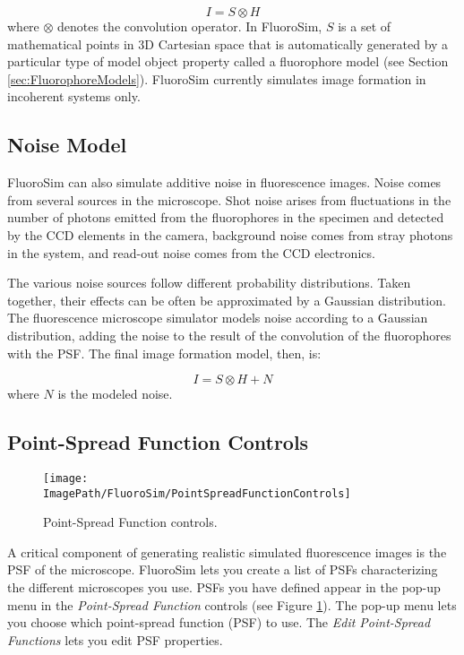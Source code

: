 \documentclass[11pt,titlepage,twoside]{article}
\begin{document}
\begin{equation}
I = S \otimes H
\end{equation}
where $\otimes$ denotes the convolution operator. In FluoroSim, $S$ is a set of mathematical points in 3D Cartesian space that is automatically generated by a particular type of model object property called a fluorophore model (see Section \ref{sec:FluorophoreModels}). FluoroSim currently simulates image formation in incoherent systems only. 

\subsection{Noise Model}

FluoroSim can also simulate additive noise in fluorescence images. Noise comes from several sources in the microscope. Shot noise arises from fluctuations in the number of photons emitted from the fluorophores in the specimen and detected by the CCD elements in the camera, background noise comes from stray photons in the system, and read-out noise comes from the CCD electronics.

The various noise sources follow different probability distributions. Taken together, their effects can be often be approximated by a Gaussian distribution. The fluorescence microscope simulator models noise according to a Gaussian distribution, adding the noise to the result of the convolution of the fluorophores with the PSF. The final image formation model, then, is:

\begin{equation}
I = S \otimes H + N
\end{equation}
where $N$ is the modeled noise. 

\subsection{Point-Spread Function Controls}

\begin{figure}[htbp] %
   \centering
   \texttt{[image: \\ImagePath/FluoroSim/PointSpreadFunctionControls]} 
   \caption{Point-Spread Function controls.}
   \label{fig:PointSpreadFunctionControls}
\end{figure}

A critical component of generating realistic simulated fluorescence images is the PSF of the microscope. FluoroSim lets you create a list of PSFs characterizing the different microscopes you use. PSFs you have defined appear in the pop-up menu in the \emph{Point-Spread Function} controls (see Figure \ref{fig:PointSpreadFunctionControls}). The pop-up menu lets you choose which point-spread function (PSF) to use. The \emph{Edit Point-Spread Functions} lets you edit PSF properties.
\end{document}
